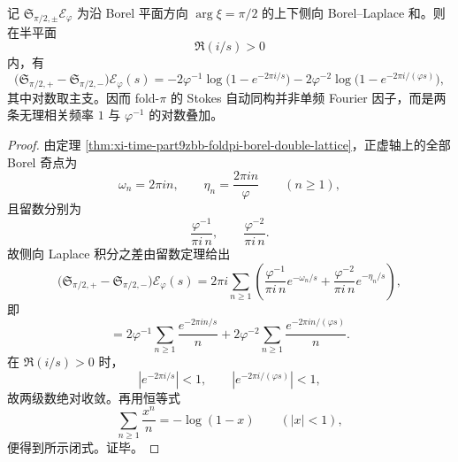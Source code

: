 \begin{proposition}\label{prop:xi-time-part9zbb-foldpi-stokes-two-frequency}
记 \(\mathfrak S_{\pi/2,\pm}\mathcal E_\varphi\) 为沿 Borel 平面方向 \(\arg\xi=\pi/2\) 的上下侧向 Borel--Laplace 和。则在半平面
\[
\Re(i/s)>0
\]
内，有
\[
\bigl(\mathfrak S_{\pi/2,+}-\mathfrak S_{\pi/2,-}\bigr)\mathcal E_\varphi(s)
=
-2\varphi^{-1}\log\!\bigl(1-e^{-2\pi i/s}\bigr)
-2\varphi^{-2}\log\!\bigl(1-e^{-2\pi i/(\varphi s)}\bigr),
\]
其中对数取主支。因而 fold-\(\pi\) 的 Stokes 自动同构并非单频 Fourier 因子，而是两条无理相关频率 \(1\) 与 \(\varphi^{-1}\) 的对数叠加。
\end{proposition}
\begin{proof}
由定理 \ref{thm:xi-time-part9zbb-foldpi-borel-double-lattice}，正虚轴上的全部 Borel 奇点为
\[
\omega_n=2\pi i n,
\qquad
\eta_n=\frac{2\pi i n}{\varphi}
\qquad (n\ge 1),
\]
且留数分别为
\[
\frac{\varphi^{-1}}{\pi i\,n},
\qquad
\frac{\varphi^{-2}}{\pi i\,n}.
\]
故侧向 Laplace 积分之差由留数定理给出
\[
\bigl(\mathfrak S_{\pi/2,+}-\mathfrak S_{\pi/2,-}\bigr)\mathcal E_\varphi(s)
=
2\pi i\sum_{n\ge 1}
\left(
\frac{\varphi^{-1}}{\pi i\,n}e^{-\omega_n/s}
+
\frac{\varphi^{-2}}{\pi i\,n}e^{-\eta_n/s}
\right),
\]
即
\[
=
2\varphi^{-1}\sum_{n\ge 1}\frac{e^{-2\pi i n/s}}{n}
+
2\varphi^{-2}\sum_{n\ge 1}\frac{e^{-2\pi i n/(\varphi s)}}{n}.
\]
在 \(\Re(i/s)>0\) 时，
\[
\left|e^{-2\pi i/s}\right|<1,
\qquad
\left|e^{-2\pi i/(\varphi s)}\right|<1,
\]
故两级数绝对收敛。再用恒等式
\[
\sum_{n\ge 1}\frac{x^n}{n}=-\log(1-x)
\qquad (|x|<1),
\]
便得到所示闭式。证毕。
\end{proof}

